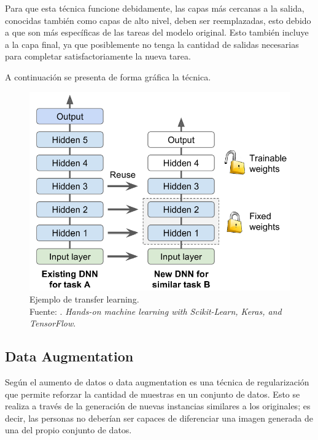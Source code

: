 Para que esta técnica funcione debidamente, las capas más cercanas a la salida, conocidas también como capas de alto nivel, deben ser reemplazadas, esto debido a que son más específicas de las tareas del modelo original. Esto también incluye a la capa final, ya que posiblemente no tenga la cantidad de salidas necesarias para completar satisfactoriamente la nueva tarea.

A continuación se presenta de forma gráfica la técnica.

\begin{figure}[H]
	\begin{center}
		\includegraphics[width=1.00\textwidth]{2/figures/transfer_learning.PNG}
		\caption[Ejemplo de transfer learning]{Ejemplo de transfer learning. \\
		Fuente: \cite{bk_geron2022handml}. \textit{Hands-on machine learning with Scikit-Learn, Keras, and TensorFlow}.}
		\label{2:fig210}
	\end{center}
\end{figure}


\subsection{Data Augmentation}

Según \cite{bk_geron2022handml} el aumento de datos o data augmentation es una técnica de regularización que permite reforzar la cantidad de muestras en un conjunto de datos. Esto se realiza a través de la generación de nuevas instancias similares a los originales; es decir, las personas no deberían ser capaces de diferenciar una imagen generada de una del propio conjunto de datos.

